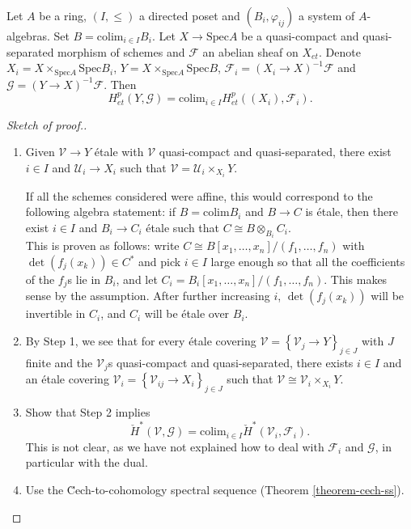 \begin{theorem} \label{thm:directedColimitsAndCohomology}
Let $A$ be a ring, $(I, \leq)$ a directed poset and $(B_i, \varphi_{ij})$ a 
system of $A$-algebras. Set $B=\text{colim}_{i\in I} B_i$. Let $X \to 
\text{Spec} A$ be a quasi-compact and quasi-separated morphism of schemes and 
$\mathcal{F}$ an abelian sheaf on $X_{et}$. Denote $X_i = X\times_{\text{Spec} 
A} \text{Spec} B_i$,  $Y= X \times_{\text{Spec} A}\text{Spec} B$, 
$\mathcal{F}_i = (X_i\to X)^{-1}\mathcal{F}$ and $\mathcal{G} = (Y\to 
X)^{-1}\mathcal{F}$. Then
$$
H_{et}^p(Y, \mathcal{G}) = \text{colim}_{i\in I} H_{et}^p ((X_i), 
\mathcal{F}_i).
$$
\end{theorem}

\begin{proof}[Sketch of proof.]$ $
\begin{enumerate}
\item 
Given $\mathcal{V}\to Y$ \'etale with $\mathcal{V}$ quasi-compact and 
quasi-separated, there exist $i\in I$ and $\mathcal{U}_i \to X_i$ such that 
$\mathcal{V} = \mathcal{U}_i \times_{X_i} Y$. 
\begin{remark}
If all the schemes considered were affine, this would correspond to the 
following algebra statement: if $B=\text{colim} B_i$ and $B\to C$ is \'etale, 
then there exist $i\in I$ and $B_i\to C_i$ \'etale such that $C \cong B 
\otimes_{B_i} C_i$. 
\\
This is proven as follows: write $C \cong B\left[x_1,\ldots, x_n\right]/(f_1, 
\ldots, f_n)$ with $\det (f_j(x_k)) \in C^*$ and pick $i\in I$ large enough so 
that all the coefficients of the $f_j$s lie in $B_i$, and let $C_i = 
B_i\left[x_1, \ldots, x_n\right]/(f_1, \dots, f_n)$. This makes sense by the 
assumption. After further increasing $i$, $\det (f_j(x_k))$ will be invertible 
in $C_i$, and $C_i$ will be \'etale over $B_i$. 
\end{remark}
\item 
By Step 1, we see that for every \'etale covering $\mathcal{V} = 
\left\{\mathcal{V}_j\to Y\right\}_{j\in J}$ with $J$ finite and the 
$\mathcal{V}_j$s quasi-compact and quasi-separated, there exists $i\in I$ and 
an \'etale covering $\mathcal{V}_i = \left\{\mathcal{V}_{ij} \to X_i 
\right\}_{j\in J}$ such that $\mathcal{V} \cong \mathcal{V}_i\times_{X_i} Y$. 
\item 
Show that Step 2 implies 
$$
\check H^*(\mathcal{V}, \mathcal{G})=\text{colim}_{i\in I}\check 
H^*(\mathcal{V}_i, \mathcal{F}_i).
$$ 
This is not clear, as we have not explained how to deal with $\mathcal{F}_i$ 
and $\mathcal{G}$, in particular with the dual.
\item Use the \u Cech-to-cohomology spectral sequence
(Theorem \ref{theorem-cech-ss}). 
\end{enumerate}
\end{proof}





